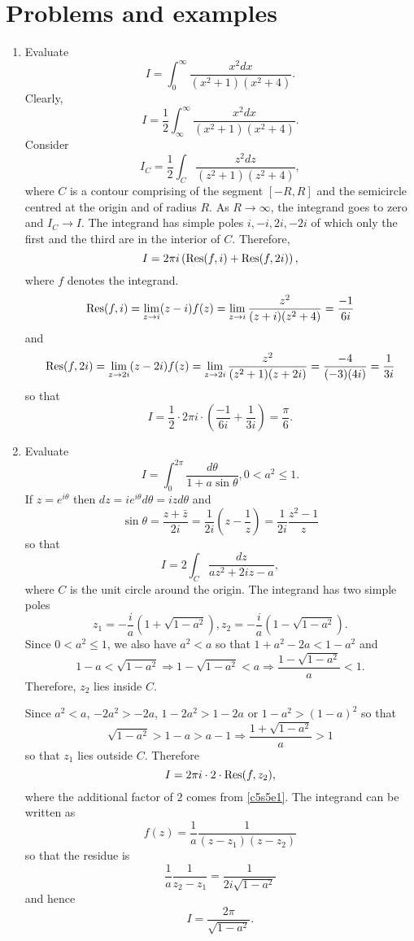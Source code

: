 \section{Problems and examples}\label{c5s5}
\begin{enumerate}
\item Evaluate \cite{dk}
\[
I = \int_0^\infty \frac{x^2dx}{(x^2 + 1)(x^2 + 4)}.
\]
Clearly,
\[
I = \frac{1}{2}\int_{\infty}^\infty \frac{x^2dx}{(x^2 + 1)(x^2 + 4)}.
\]
Consider
\[
I_C = \frac{1}{2}\int_C \frac{z^2dz}{(z^2 + 1)(z^2 + 4)},
\]
where $C$ is a contour comprising of the segment $[-R, R]$ and the semicircle centred
at the origin and of radius $R$. As $R \rightarrow \infty$, the integrand goes to
zero and $I_C \rightarrow I$. The integrand has simple poles $i, -i, 2i, -2i$ of which
only the first and the third are in the interior of $C$. Therefore,
\[
I = 2\pi i\left(\operatorname{Res}(f, i) + \operatorname{Res}(f, 2i)\right),
\]
where $f$ denotes the integrand. 
\[
\operatorname{Res}(f, i) = \lim_{z \rightarrow i}(z - i)f(z) = 
\lim_{z \rightarrow i}\frac{z^2}{(z+i)(z^2+4)} = \frac{-1}{6i}
\]
and
\[
\operatorname{Res}(f, 2i) = \lim_{z \rightarrow 2i}(z - 2i)f(z) = 
\lim_{z \rightarrow 2i}\frac{z^2}{(z^2+1)(z+2i)} = \frac{-4}{(-3)(4i)} = \frac{1}{3i}
\]
so that
\[
I = \frac{1}{2}\cdot 2\pi i \cdot \left(\frac{-1}{6i} + \frac{1}{3i}\right) = \frac{\pi}{6}.
\]

\item Evaluate \cite{dk}
\[
I = \int_0^{2\pi}\frac{d\theta}{1 + a\sin\theta}, 0 < a^2 \le 1.
\]
If $z = e^{i\theta}$ then $dz = ie^{i\theta}d\theta = izd\theta$ and
\[
\sin\theta = \frac{z + \bar{z}}{2i} = \frac{1}{2i}\left(z - \frac{1}{z}\right) =
\frac{1}{2i}\frac{z^2 - 1}{z}
\]
so that
\begin{equation}\label{c5s5e1}
I = 2\int_C \frac{dz}{az^2+2iz-a},
\end{equation}
where $C$ is the unit circle around the origin. The integrand has two simple poles
\[
z_1 = -\frac{i}{a}(1 + \sqrt{1 - a^2}), z_2 = -\frac{i}{a}(1 - \sqrt{1 - a^2}).
\]
Since $0 < a^2 \le 1$, we also have $a^2 < a$ so that $1 + a^2 - 2a < 1 - a^2$ and
\[
1 - a < \sqrt{1 - a^2} \Rightarrow 1 - \sqrt{1 - a^2} < a \Rightarrow
\frac{1 - \sqrt{1 - a^2}}{a} < 1.
\]
Therefore, $z_2$ lies inside $C$.

Since $a^2 < a$, $-2a^2 > -2a$, $1 - 2a^2 > 1 - 2a$ or $1 - a^2 > (1 - a)^2$ so that
\[
\sqrt{1 - a^2} > 1 - a > a - 1 \Rightarrow \frac{ 1 + \sqrt{1 - a^2}}{a} > 1
\]
so that $z_1$ lies outside $C$. Therefore
\[
I = 2\pi i \cdot 2 \cdot \operatorname{Res}(f, z_2),
\]
where the additional factor of $2$ comes from \eqref{c5s5e1}. The integrand can be 
written as 
\[
f(z) = \frac{1}{a}\frac{1}{(z-z_1)(z-z_2)}
\]
so that the residue is
\[
\frac{1}{a}\frac{1}{z_2 - z_1} = \frac{1}{2i\sqrt{1-a^2}}
\]
and hence
\[
I = \frac{2\pi}{\sqrt{1 - a^2}}.
\]


\end{enumerate}
